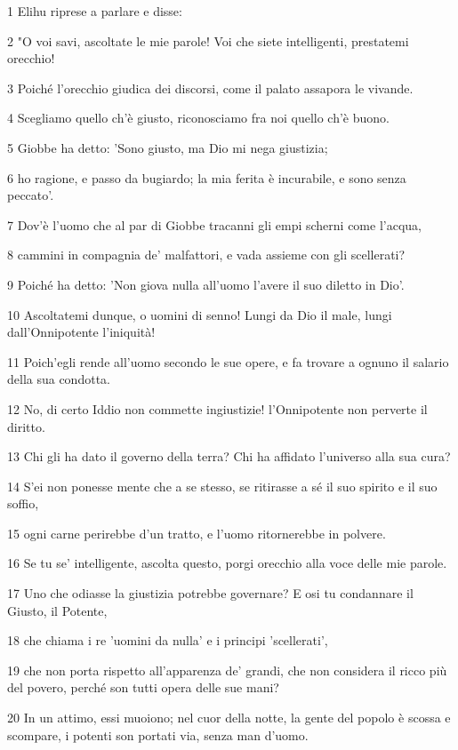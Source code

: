 \par 1 Elihu riprese a parlare e disse:
\par 2 "O voi savi, ascoltate le mie parole! Voi che siete intelligenti, prestatemi orecchio!
\par 3 Poiché l'orecchio giudica dei discorsi, come il palato assapora le vivande.
\par 4 Scegliamo quello ch'è giusto, riconosciamo fra noi quello ch'è buono.
\par 5 Giobbe ha detto: 'Sono giusto, ma Dio mi nega giustizia;
\par 6 ho ragione, e passo da bugiardo; la mia ferita è incurabile, e sono senza peccato'.
\par 7 Dov'è l'uomo che al par di Giobbe tracanni gli empi scherni come l'acqua,
\par 8 cammini in compagnia de' malfattori, e vada assieme con gli scellerati?
\par 9 Poiché ha detto: 'Non giova nulla all'uomo l'avere il suo diletto in Dio'.
\par 10 Ascoltatemi dunque, o uomini di senno! Lungi da Dio il male, lungi dall'Onnipotente l'iniquità!
\par 11 Poich'egli rende all'uomo secondo le sue opere, e fa trovare a ognuno il salario della sua condotta.
\par 12 No, di certo Iddio non commette ingiustizie! l'Onnipotente non perverte il diritto.
\par 13 Chi gli ha dato il governo della terra? Chi ha affidato l'universo alla sua cura?
\par 14 S'ei non ponesse mente che a se stesso, se ritirasse a sé il suo spirito e il suo soffio,
\par 15 ogni carne perirebbe d'un tratto, e l'uomo ritornerebbe in polvere.
\par 16 Se tu se' intelligente, ascolta questo, porgi orecchio alla voce delle mie parole.
\par 17 Uno che odiasse la giustizia potrebbe governare? E osi tu condannare il Giusto, il Potente,
\par 18 che chiama i re 'uomini da nulla' e i principi 'scellerati',
\par 19 che non porta rispetto all'apparenza de' grandi, che non considera il ricco più del povero, perché son tutti opera delle sue mani?
\par 20 In un attimo, essi muoiono; nel cuor della notte, la gente del popolo è scossa e scompare, i potenti son portati via, senza man d'uomo.
